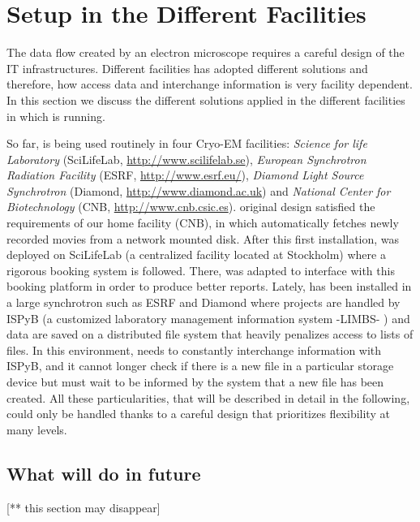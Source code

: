 \section{\scipion Setup in the Different Facilities}

The data flow created by an electron microscope requires a careful design of the IT infrastructures.  Different facilities has adopted different solutions and therefore, 
how \scipion  access data and interchange information is very facility dependent. In this section we discuss  the different solutions applied in the different facilities in which \scipion is running.

So far, \scipion is being used routinely in four Cryo-EM facilities: \emph{Science for life Laboratory} (SciLifeLab, \url{http://www.scilifelab.se}),  \emph{European Synchrotron Radiation Facility} (ESRF, \url{http://www.esrf.eu/}), \emph{Diamond Light Source Synchrotron} (Diamond, \url{http://www.diamond.ac.uk}) and \emph{National Center for Biotechnology} (CNB, \url{http://www.cnb.csic.es}). \scipion original design satisfied the requirements of our home facility (CNB), in which \scipion automatically fetches newly recorded movies from a network mounted disk. After this first installation, \scipion was deployed on SciLifeLab (a centralized facility located at Stockholm) where a rigorous booking system is followed. There, \scipion was adapted to interface with this booking platform in order to produce better reports. Lately,  \scipion has been installed in a large synchrotron  such as ESRF and Diamond  where projects are handled by ISPyB (a customized laboratory management information system -LIMBS- \citep{Delageniere2011}) and data are saved on a distributed file system that heavily penalizes access to lists of files. In this environment, \scipion needs to constantly interchange information with ISPyB, and it cannot longer check if there is a new file in a particular storage device but must wait to be informed by the system that a new file has been created. All these particularities, that will be described in detail in the following, could only be handled thanks to a careful design that prioritizes flexibility at many levels. 








\subsection{What will do in future}
[** this section may disappear] 


